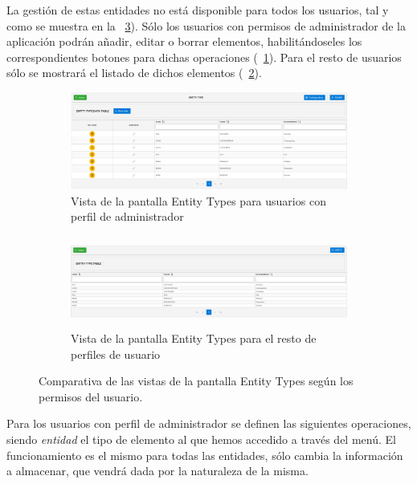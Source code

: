 La gestión de estas entidades no está disponible para todos los usuarios, tal y como se muestra en la \figurename~\ref{fig:parametrizacion}). Sólo los usuarios con permisos de administrador de la aplicación podrán añadir, editar o borrar elementos, habilitándoseles los correspondientes botones para dichas operaciones (\figurename~\ref{fig:parametrizacion-admin}). Para el resto de usuarios sólo se mostrará el listado de dichos elementos (\figurename~\ref{fig:parametrizacion-usuario}).


\begin{figure}[H]
  \centering
  \begin{subfigure}[c]{\textwidth}
    \includegraphics[width=\textwidth]{imaxes/entity-type-admin.png}
    \caption{Vista de la pantalla Entity Types para usuarios con perfil de administrador\newline}
    \label{fig:parametrizacion-admin}
  \end{subfigure}
  \begin{subfigure}[c]{\textwidth}
    \includegraphics[width=\textwidth,height=3cm]{imaxes/entity-type-usuario.png}
    \caption{Vista de la pantalla Entity Types para el resto de perfiles de usuario}
    \label{fig:parametrizacion-usuario}
  \end{subfigure}
  \caption{Comparativa de las vistas de la pantalla Entity Types según los permisos del usuario.}
  \label{fig:parametrizacion}
\end{figure}

Para los usuarios con perfil de administrador se definen las siguientes operaciones, siendo \textit{entidad} el tipo de elemento al que hemos accedido a través del menú. El funcionamiento es el mismo para todas las entidades, sólo cambia la información a almacenar, que vendrá dada por la naturaleza de la misma.

